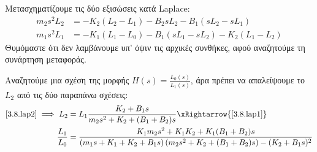 \documentclass[11pt,a4paper,notitlepage,fleqn,final]{article}
\begin{document}
\begin{exercise}[3.8]
Μετασχηματίζουμε τις δύο εξισώσεις κατά Laplace:
\begin{align}
	m_2s^2L_2 &= -K_2(L_2-L_1) - B_2sL_2 - B_1(sL_2-sL_1) \label{3.8.lap2} \\
	m_1s^2L_1 &= -K_1(L_1-L_0) - B_1(sL_1-sL_2) - K_2(L_1-L_2) \label{3.8.lap1}
\end{align}
Θυμόμαστε ότι δεν λαμβάνουμε υπ' όψιν τις αρχικές συνθήκες, αφού αναζητούμε τη συνάρτηση
μεταφοράς.

Αναζητούμε μια σχέση της μορφής \( H(s) = \frac{L_0(s)}{L_1(s)} \), άρα πρέπει να απαλείψουμε
το \( L_2 \) από τις δύο παραπάνω σχέσεις:
\begin{align*}
	\eqref{3.8.lap2} \implies L_2 &=
	L_1 \frac{K_2+B_1s}{m_2s^2+K_2+(B_1+B_2)s} \xRightarrow{\eqref{3.8.lap1}} \\
	\frac{L_1}{L_0}
	&= \frac{K_1m_2s^2+K_1K_2+K_1(B_1+B_2)s}{
		(m_1s+K_1+K_2+B_1s)\left(m_2s^2+K_2+(B_1+B_2)s\right)-(K_2+B_1s)^2}
\end{align*}

\end{exercise}
\end{document}
